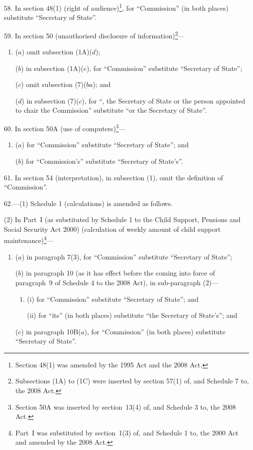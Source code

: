 \documentclass[12pt,a4paper]{article}
\begin{document}
\medskip

58.  In section 48(1) (right of audience)\footnote{Section 48(1) was amended by the 1995 Act and the 2008 Act.}, for “Commission” (in both places) substitute “Secretary of State”.

\medskip

59.  In section 50 (unauthorised disclosure of information)\footnote{Subsections (1A) to (1C) were inserted by section 57(1) of, and Schedule 7 to, the 2008 Act.}—
\begin{enumerate}\item[]
($a$) omit subsection (1A)($d$);

($b$) in subsection (1A)($e$), for “Commission” substitute “Secretary of State”;

($c$) omit subsection (7)($ba$); and

($d$) in subsection (7)($c$), for “, the Secretary of State or the person appointed to chair the Commission” substitute “or the Secretary of State”.
\end{enumerate}

60.  In section 50A (use of computers)\footnote{Section 50A was inserted by section~13(4) of, and Schedule 3 to, the 2008 Act.}—
\begin{enumerate}\item[]
($a$) for “Commission” substitute “Secretary of State”; and

($b$) for “Commission’s” substitute “Secretary of State’s”.
\end{enumerate}

\medskip

61.  In section 54 (interpretation), in subsection (1), omit the definition of “Commission”.

\medskip

62.---(1)  Schedule 1 (calculations) is amended as follows.

(2) In Part~I (as substituted by Schedule 1 to the Child Support, Pensions and Social Security Act 2000) (calculation of weekly amount of child support maintenance)\footnote{Part~I was substituted by section~1(3) of, and Schedule 1 to, the 2000 Act and amended by the 2008 Act.}—
\begin{enumerate}\item[]
($a$) in paragraph 7(3), for “Commission” substitute “Secretary of State”;

($b$) in paragraph 10 (as it has effect before the coming into force of paragraph~9 of Schedule 4 to the 2008 Act), in sub-paragraph (2)—
\begin{enumerate}\item[]
(i)  for “Commission” substitute “Secretary of State”; and

(ii) for “its” (in both places) substitute “the Secretary of State’s”; and
\end{enumerate}

($c$) in paragraph 10B($a$), for “Commission” (in both places) substitute “Secretary of State”.
\end{enumerate}
\end{document}
